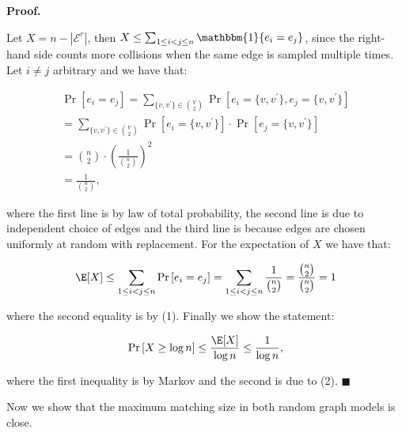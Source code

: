 \documentclass[10pt,a4paper]{article}
\begin{document}
\par\medskip\noindent\textbf{Proof.}\par



Let $X=n-|\mathcal{E}^{r}|$, then $X\leq\sum_{1\leq i<j\leq n}\mathbbm{1}\{e_{i}=e_{j}\}$, since the right-hand side counts more collisions when the same edge is sampled multiple times.
Let $i\neq j$ arbitrary and we have that:\par


\[\begin{gathered}
\displaystyle\Pr\left[e_{i}=e_{j}\right] \displaystyle=\sum_{\{v,v^{\prime}\}\in\binom{V}{2}}\Pr\left[e_{i}=\{v,v^{\prime}\},e_{j}=\{v,v^{\prime}\}\right] \\
\displaystyle=\sum_{\{v,v^{\prime}\}\in\binom{V}{2}}\Pr\left[e_{i}=\{v,v^{\prime}\}\right]\cdot\Pr\left[e_{j}=\{v,v^{\prime}\}\right] \\
\displaystyle=\binom{n}{2}\cdot\left(\frac{1}{\binom{n}{2}}\right)^{2} \\
\displaystyle=\frac{1}{\binom{n}{2}},
\end{gathered}\]


where the first line is by law of total probability, the second line is due to independent choice of edges and the third line is because edges are chosen uniformly at random with replacement.
For the expectation of $X$ we have that:\par


\[\begin{gathered}
\displaystyle\E[X]\leq\sum_{1\leq i<j\leq n}\Pr\left[e_{i}=e_{j}\right]=\sum_{1\leq i<j\leq n}\frac{1}{\binom{n}{2}}=\frac{\binom{n}{2}}{\binom{n}{2}}=1
\end{gathered}\]


where the second equality is by (1).
Finally we show the statement:\par


\[\begin{gathered}
\displaystyle\Pr\left[X\geq\log{n}\right]\leq\frac{\E[X]}{\log{n}}\leq\frac{1}{\log{n}},
\end{gathered}\]


where the first inequality is by Markov and the second is due to (2).
\ensuremath{\blacksquare}\par





Now we show that the maximum matching size in both random graph models is close.\par
\end{document}
